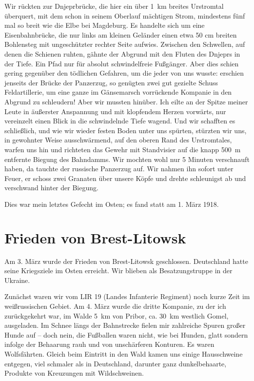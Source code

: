 \documentclass[a5paper,pagesize,10pt,twoside=true]{scrbook}
\renewcommand{\marginpar}[2][]{}
\begin{document}
Wir rückten zur Dnjeprbrücke, die hier ein über 1~km breites Urstromtal überquert, mit dem schon in seinem Oberlauf mächtigen Strom, mindestens fünf mal so breit wie die Elbe bei Magdeburg. Es handelte sich um eine Eisenbahnbrücke, die nur links am kleinen Geländer einen etwa 50 cm breiten Bohlensteg mit ungeschützter rechter Seite aufwies. Zwischen den Schwellen, auf denen die Schienen ruhten, gähnte der Abgrund mit den Fluten des Dnjeprs in der Tiefe. Ein Pfad nur für absolut schwindelfreie Fußgänger. Aber dies schien gering gegenüber den tödlichen Gefahren, um die jeder von uns wusste: erschien jenseits der Brücke der Panzerzug, so genügten zwei gut gezielte Schuss Feldartillerie, um eine ganze im Gänsemarsch vorrückende Kompanie in den Abgrund zu schleudern! Aber wir mussten hinüber. Ich eilte an der Spitze meiner Leute in äußerster Anspannung und mit klopfendem Herzen vorwärts, nur vereinzelt einen Blick in die schwindelnde Tiefe wagend. Und wir schafften es schließlich, und wie wir wieder festen Boden unter uns spürten, stürzten wir uns, in gewohnter Weise ausschwärmend, auf den oberen Rand des Urstromtales, warfen uns hin und richteten das Gewehr mit Standvisier auf die knapp 500~m entfernte Biegung des Bahndamms. Wir mochten wohl nur 5 Minuten verschnauft haben, da tauchte der russische Panzerzug auf. Wir nahmen ihn sofort unter Feuer, er schoss zwei Granaten über unsere Köpfe und drehte schleunigst ab und verschwand hinter der Biegung.

Dies war mein letztes Gefecht im Osten; es fand statt am 1. März 1918.

\section{Frieden von Brest-Litowsk}
Am 3. März wurde der Frieden von Brest-Litowsk geschlossen. Deutschland hatte seine Kriegsziele im Osten erreicht. Wir blieben als Besatzungstruppe in der Ukraine.

\marginpar{340}
Zunächst waren wir vom LIR 19 (Landes Infanterie Regiment) noch kurze Zeit im weißrussischen Gebiet. Am 4. März wurde die dritte Kompanie, zu der ich zurückgekehrt war, im Walde 5~km von Pribor, ca. 30~km westlich Gomel, ausgeladen. Im Schnee längs der Bahnstrecke fielen mir zahlreiche Spuren großer Hunde auf -- doch nein, die Fußballen waren nicht, wie bei Hunden, glatt sondern infolge der Behaarung rauh und von unschärferen Konturen. Es waren Wolfsfährten. Gleich beim Eintritt in den Wald kamen uns einige Hausschweine entgegen, viel schmaler als in Deutschland, darunter ganz dunkelbehaarte, Produkte von Kreuzungen mit Wildschweinen.
\end{document}
